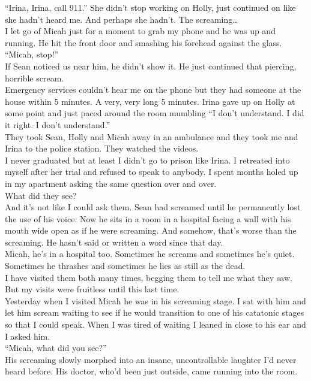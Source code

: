 \documentclass[a5paper]{scrartcl}
\begin{document}
\enquote{Irina, Irina, call 911.} She didn't stop working on Holly, just continued on like she hadn't heard me. And perhaps she hadn't. The screaming\dots\\
I let go of Micah just for a moment to grab my phone and he was up and running. He hit the front door and smashing his forehead against the glass.\\
\enquote{Micah, stop!}\\
If Sean noticed us near him, he didn't show it. He just continued that piercing, horrible scream.\\
Emergency services couldn't hear me on the phone but they had someone at the house within 5 minutes. A very, very long 5 minutes. Irina gave up on Holly at some point and just paced around the room mumbling \enquote{I don't understand. I did it right. I don't understand.}\\
They took Sean, Holly and Micah away in an ambulance and they took me and Irina to the police station. They watched the videos.\\
I never graduated but at least I didn't go to prison like Irina. I retreated into myself after her trial and refused to speak to anybody. I spent months holed up in my apartment asking the same question over and over.\\
What did they see?\\
And it's not like I could ask them. Sean had screamed until he permanently lost the use of his voice. Now he sits in a room in a hospital facing a wall with his mouth wide open as if he were screaming. And somehow, that's worse than the screaming. He hasn't said or written a word since that day.\\
Micah, he's in a hospital too. Sometimes he screams and sometimes he's quiet. Sometimes he thrashes and sometimes he lies as still as the dead.\\
I have visited them both many times, begging them to tell me what they saw. But my visits were fruitless until this last time.\\
Yesterday when I visited Micah he was in his screaming stage. I sat with him and let him scream waiting to see if he would transition to one of his catatonic stages so that I could speak. When I was tired of waiting I leaned in close to his ear and I asked him.\\
\enquote{Micah, what did you see?}\\
His screaming slowly morphed into an insane, uncontrollable laughter I'd never heard before. His doctor, who'd been just outside, came running into the room.\\
\end{document}
